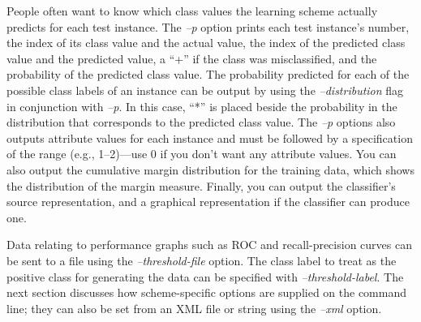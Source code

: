 People often want to know which class values the learning scheme
actually predicts for each test instance. The \textit{--p} option
prints each test instance's number, the index of its class value and
the actual value, the index of the predicted class value and the
predicted value, a ``+'' if the class was misclassified, and the
probability of the predicted class value. The probability predicted
for each of the possible class labels of an instance can be output by
using the \textit{--distribution} flag in conjunction
with \textit{--p}. In this case, ``*'' is placed beside the
probability in the distribution that corresponds to the predicted
class value. The \textit{--p} options also outputs attribute values
for each instance and must be followed by a specification of the range
(e.g., 1--2)---use 0 if you don't want any attribute values. You can
also output the cumulative margin distribution for the training data,
which shows the distribution of the margin measure. Finally, you can
output the classifier's source representation, and a graphical
representation if the classifier can produce one.

Data relating to performance graphs such as ROC and recall-precision
curves can be sent to a file using the \textit{--threshold-file}
option. The class label to treat as the positive class for generating
the data can be specified with \textit{--threshold-label}. The next
section discusses how scheme-specific options are supplied on the
command line; they can also be set from an XML file or string using
the \textit{--xml} option.

